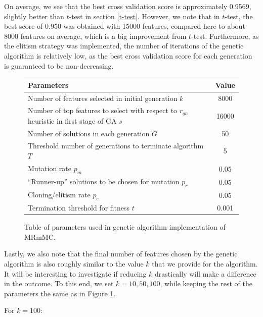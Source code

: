 \documentclass[12pt, twoside, a4paper]{report}
\begin{document}
On average, we see that the best cross validation score is approximately 0.9569, slightly better than $t$-test in section \ref{t-test}. However, we note that in $t$-test, the best score of 0.950 was obtained with 15000 features, compared here to about 8000 features on average, which is a big improvement from $t$-test. Furthermore, as the elitism strategy was implemented, the number of iterations of the genetic algorithm is relatively low, as the best cross validation score for each generation is guaranteed to be non-decreasing.

\begin{figure}
\begin{center}
    \begin{tabular}{| p{12cm} | c |} \hline
    Parameters & Value \\ \hline \hline
    Number of features selected in initial generation $k$ & 8000 \\ \hline
    Number of top features to select with respect to $r_{qn}$ heuristic in first stage of GA $s$ & 16000 \\ \hline
    Number of solutions in each generation $G$ & 50 \\ \hline
    Threshold number of generations to terminate algorithm $T$ & 5 \\ \hline
    Mutation rate $p_m$ &  0.05 \\ \hline
    ``Runner-up'' solutions to be chosen for mutation $p_r$ & 0.05 \\ \hline
    Cloning/elitism rate $p_e$ & 0.05 \\ \hline
    Termination threshold for fitness $t$ & 0.001 \\ \hline
    \end{tabular}
\end{center}
\caption{Table of parameters used in genetic algorithm implementation of MRmMC.}
\label{ga:mrmmc:params_1}
\end{figure}

Lastly, we also note that the final number of features chosen by the genetic algorithm is also roughly similar to the value $k$ that we provide for the algorithm. It will be interesting to investigate if reducing $k$ drastically will make a difference in the outcome. To this end, we set $k=10,50,100$, while keeping the rest of the parameters the same as in Figure \ref{ga:mrmmc:params_1}.

For $k=100$:
\end{document}
